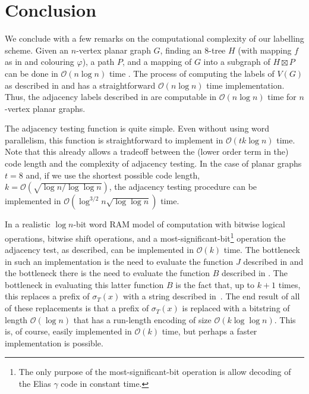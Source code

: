 \documentclass[kpfonts]{patmorin}
\newcommand{\Oh}{\mathcal{O}}
\begin{document}
\begin{comment}
\begin{thm}\thmlabel{main-product}
  For every fixed $t\in\N$, the family of all graphs $G$ such that $G$ is a subgraph of $H\boxtimes P$ for some $t$-tree $H$ and some path $P$ has a $(1+o(1))\log n$-bit adjacency labelling scheme.
\end{thm}

\thmref{main} and \thmref{main-all} are immediate consequences of \thmref{main-product}, \thmref{product-structure}, and \thmref{product-structure-all}.
\end{comment}
\section{Conclusion}

We conclude with a few remarks on the computational complexity of our labelling scheme.  Given an $n$-vertex planar graph $G$, finding an 8-tree $H$ (with mapping $f$ as in  and colouring $\varphi$), a path $P$, and a mapping of $G$ into a subgraph of $H\boxtimes P$ can be done in $\Oh(n\log n)$ time \cite{morin:fast}.  The process of computing the labels of $V(G)$ as described in  and  has a straightforward $\Oh(n\log n)$ time implementation.  Thus, the adjacency labels described in  are computable in $\Oh(n\log n)$ time for $n$-vertex planar graphs.

The adjacency testing function is quite simple. Even without using word parallelism, this function is straightforward to implement in $\Oh(tk\log n)$ time.  Note that this already allows a tradeoff between the (lower order term in the) code length and the complexity of adjacency testing.
In the case of planar graphs $t=8$ and, if we use the shortest possible code length, $k=\Oh(\sqrt{\log n / \log\log n})$, the adjacency testing procedure can be implemented in $\Oh(\log^{3/2} n\sqrt{\log\log n})$ time.

In a realistic $\log n$-bit word RAM model of computation with bitwise logical operations, bitwise shift operations, and a most-significant-bit\footnote{The only purpose of the most-significant-bit operation is allow decoding of the Elias $\gamma$ code in constant time.} operation the adjacency test, as described, can be implemented in $\Oh(k)$ time.  The bottleneck in such an implementation is the need to evaluate the function $J$ described in  and the bottleneck there is the need to evaluate the function $B$ described in .  The bottleneck in evaluating this latter function $B$ is the fact that, up to $k+1$ times, this replaces a prefix of $\sigma_T(x)$ with a string described in~.  The end result of all of these replacements is that a prefix of $\sigma_T(x)$ is replaced with a bitstring of length $\Oh(\log n)$ that has a run-length encoding of size $\Oh(k\log\log n)$.  This is, of course, easily implemented in $\Oh(k)$ time, but perhaps a faster implementation is possible.
\end{document}
